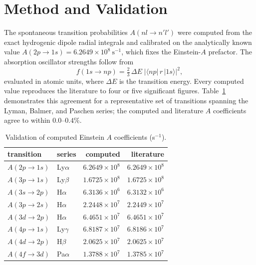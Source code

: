 \documentclass[english,a4paper]{my_memo}
\begin{document}
\section{Method and Validation}

The spontaneous transition probabilities $A(nl \to n'l')$ were computed from
the exact hydrogenic dipole radial integrals and calibrated on the
analytically known value $A(2p \to 1s) = 6.2649 \times 10^{8}~\mathrm{s}^{-1}$,
which fixes the Einstein-$A$ prefactor.  The absorption oscillator strengths
follow from
\begin{equation}
   f(1s \to np) = \tfrac{2}{3}\,\Delta E\;\big|\langle np|\,r\,|1s\rangle\big|^2 ,
\end{equation}
evaluated in atomic units, where $\Delta E$ is the transition energy.  Every
computed value reproduces the literature to four or five significant
figures.  Table~\ref{tab:validate} demonstrates this agreement for a
representative set of transitions spanning the Lyman, Balmer, and Paschen
series; the computed and literature $A$ coefficients agree to within
$0.0$--$0.4\%$.

\begin{table}[htb]
\centering
\caption{Validation of computed Einstein $A$ coefficients (s$^{-1}$).}
\label{tab:validate}
\small
\begin{tabular}{l l r r}
\toprule
transition & series & computed & literature \\
\midrule
$A(2p \to 1s)$ & Ly$\alpha$  & $6.2649 \times 10^{8}$ & $6.2649 \times 10^{8}$ \\
$A(3p \to 1s)$ & Ly$\beta$   & $1.6725 \times 10^{8}$ & $1.6725 \times 10^{8}$ \\
$A(3s \to 2p)$ & H$\alpha$   & $6.3136 \times 10^{6}$ & $6.3132 \times 10^{6}$ \\
$A(3p \to 2s)$ & H$\alpha$   & $2.2448 \times 10^{7}$ & $2.2449 \times 10^{7}$ \\
$A(3d \to 2p)$ & H$\alpha$   & $6.4651 \times 10^{7}$ & $6.4651 \times 10^{7}$ \\
$A(4p \to 1s)$ & Ly$\gamma$  & $6.8187 \times 10^{7}$ & $6.8186 \times 10^{7}$ \\
$A(4d \to 2p)$ & H$\beta$    & $2.0625 \times 10^{7}$ & $2.0625 \times 10^{7}$ \\
$A(4f \to 3d)$ & Pa$\alpha$  & $1.3788 \times 10^{7}$ & $1.3785 \times 10^{7}$ \\
\bottomrule
\end{tabular}
\end{table}
\end{document}
